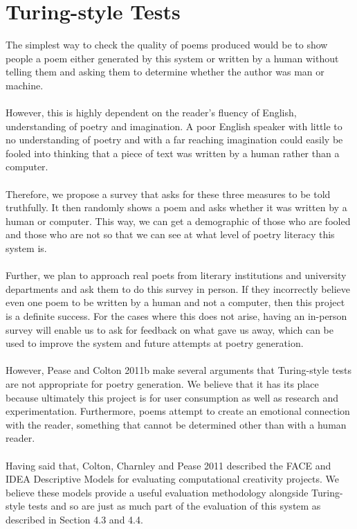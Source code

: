 \section{Turing-style Tests}
The simplest way to check the quality of poems produced would be to show people a poem either generated by this system or written by a human without telling them and asking them to determine whether the author was man or machine.
\\\\
However, this is highly dependent on the reader's fluency of English, understanding of poetry and imagination. A poor English speaker with little to no understanding of poetry and with a far reaching imagination could easily be fooled into thinking that a piece of text was written by a human rather than a computer.
\\\\
Therefore, we propose a survey that asks for these three measures to be told truthfully. It then randomly shows a poem and asks whether it was written by a human or computer. This way, we can get a demographic of those who are fooled and those who are not so that we can see at what level of poetry literacy this system is.
\\\\
Further, we plan to approach real poets from literary institutions and university departments and ask them to do this survey in person. If they incorrectly believe even one poem to be written by a human and not a computer, then this project is a definite success. For the cases where this does not arise, having an in-person survey will enable us to ask for feedback on what gave us away, which can be used to improve the system and future attempts at poetry generation.
\\\\
However, Pease and Colton 2011b make several arguments that Turing-style tests are not appropriate for poetry generation. We believe that it has its place because ultimately this project is for user consumption as well as research and experimentation. Furthermore, poems attempt to create an emotional connection with the reader, something that cannot be determined other than with a human reader.
\\\\
Having said that, Colton, Charnley and Pease 2011 described the FACE and IDEA Descriptive Models for evaluating computational creativity projects. We believe these models provide a useful evaluation methodology alongside Turing-style tests and so are just as much part of the evaluation of this system as described in Section 4.3 and 4.4.

